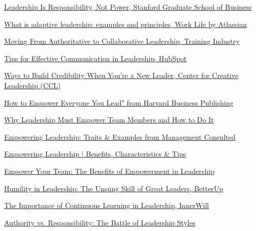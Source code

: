 \documentclass[runningheads]{llncs}
\begin{document}
\begin{thebibliography}{10}
\href{https://www.gsb.stanford.edu/insights/leadership-responsibility-not-power}{Leadership Is Responsibility, Not Power, Stanford Graduate School of Business}

\href{https://www.atlassian.com/blog/leadership/adaptive-leadership}{What is adaptive leadership: examples and principles, Work Life by Atlassian}

\href{https://trainingindustry.com/articles/leadership/moving-from-authoritative-to-collaborative-leadership-benefits-and-best-practices-to-consider/#:~:text=1}{Moving From Authoritative to Collaborative Leadership, Training Industry}

\href{https://blog.hubspot.com/marketing/build-credibility-new-leader}{Tips for Effective Communication in Leadership, HubSpot}

\href{https://www.ccl.org/articles/leading-effectively-articles/communication-1-idea-3-facts-5-tips/}{Ways to Build Credibility When You're a New Leader, Center for Creative Leadership (CCL)}

\href{https://www.harvardbusiness.org/whoever-they-are-wherever-they-are-empowering-everyone-you-lead/#:~:text=The%20best%20leaders%20make%20the,getting%20to%20know%20your%20people}{How to Empower Everyone You Lead" from Harvard Business Publishing}

\href{https://johnmattone.com/blog/why-leadership-must-empower-team-members-and-how-to-do-it/#:~:text=Empowering%20team%20members%20leads%20to,action%20of%20the%20empowered%20team}{Why Leadership Must Empower Team Members and How to Do It}

\href{https://managementconsulted.com/empowering-leadership/#:~:text=Here%20are%20some%20empowering%20leadership,They%20are%20effective%20communicators}{Empowering Leadership: Traits \& Examples from Management Consulted}

\href{https://www.leapsome.com/blog/empowering-leadership#:~:text=Empowering%20leadership%20is%20the%20practice,fits%20into%20the%20big%20picture}{Empowering Leadership | Benefits, Characteristics \& Tips}

\href{https://maven.com/articles/empowerment-in-leadership#:~:text=1,2}{Empower Your Team: The Benefits of Empowerment in Leadership}

\href{https://www.betterup.com/blog/humility-in-leadership}{Humility in Leadership: The Unsung Skill of Great Leaders, BetterUp}

\href{https://innerwill.org/continuous-learning-in-leadership/#:~:text=Our%20clients%20compete%20in%20various,very%20much%20their%20competitive%20advantage}{The Importance of Continuous Learning in Leadership, InnerWill}


\href{https://joshuamevans.com/authority-vs-responsibility-the-battle-of-leadership-styles/}{Authority vs. Responsibility: The Battle of Leadership Styles}


\end{thebibliography}
\end{document}

